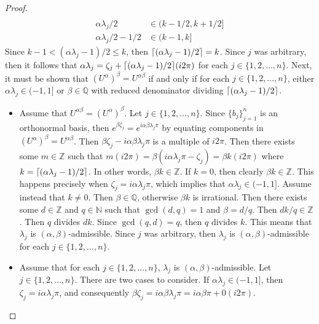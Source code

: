 \begin{proof}
\begin{align*}
        \\
        \alpha\lambda_j / 2
        &\in
        ( k - 1/2, k + 1/2 ]
        \\
        \alpha\lambda_j / 2 - 1/2
        &\in
        ( k - 1, k ]
    \end{align*}
    Since $k - 1 < ( \alpha\lambda_j - 1 ) / 2 \le k$, then $\ceil*{( \alpha \lambda_j - 1 ) / 2} = k$.
    Since $j$ was arbitrary, then it follows that $\alpha\lambda_j = \zeta_j + \ceil*{( \alpha \lambda_j - 1 ) / 2} (i2\pi)$ for each $j \in \{ 1, 2, \ldots, n \}$.
    Next, it must be shown that $( U^\alpha )^\beta = U^{\alpha\beta}$ if and only if for each $j \in \{ 1, 2, \ldots, n \}$, either $\alpha \lambda_j \in ( -1, 1 ]$ or $\beta \in \mathbb{Q}$ with reduced denominator dividing $\ceil*{( \alpha \lambda_j - 1 ) / 2}$.
    \begin{itemize}
    \item Assume that $U^{\alpha\beta} = ( U^\alpha )^\beta$.
          Let $j \in \{ 1, 2, \ldots, n \}$.
          Since $\{ b_j \}_{j=1}^n$ is an orthonormal basis, then $e^{\beta\zeta_j} = e^{i\alpha\beta\lambda_j\pi}$ by equating components in $( U^\alpha )^\beta = U^{\alpha\beta}$.
          Then $\beta\zeta_j - i\alpha\beta\lambda_j\pi$ is a multiple of $i2\pi$.
          Then there exists some $m \in \mathbb{Z}$ such that $m (i2\pi) = \beta(i\alpha\lambda_j\pi - \zeta_j) = \beta k (i2\pi)$ where $k = \ceil*{( \alpha \lambda_j - 1 ) / 2}$.
          In other words, $\beta k \in \mathbb{Z}$.
          If $k = 0$, then clearly $\beta k \in \mathbb{Z}$.
          This happens precisely when $\zeta_j = i\alpha\lambda_j\pi$, which implies that $\alpha\lambda_j \in (-1,1]$.
          Assume instead that $k \ne 0$.
          Then $\beta \in \mathbb{Q}$, otherwise $\beta k$ is irrational.
          Then there exists some $d \in \mathbb{Z}$ and $q \in \mathbb{N}$ such that $\gcd( d, q ) = 1$ and $\beta = d / q$.
          Then $dk / q \in \mathbb{Z}$.
          Then $q$ divides $dk$.
          Since $\gcd( q, d ) = q$, then $q$ divides $k$.
          This means that $\lambda_j$ is $( \alpha, \beta )$-admissible.
          Since $j$ was arbitrary, then $\lambda_j$ is $( \alpha, \beta )$-admissible for each $j \in \{ 1, 2, \ldots, n \}$.
    \item Assume that for each $j \in \{ 1, 2, \ldots, n \}$, $\lambda_j$ is $( \alpha, \beta )$-admissible.
          Let $j \in \{ 1, 2, \ldots, n \}$.
          There are two cases to consider.
          If $\alpha \lambda_j \in (-1,1]$, then $\zeta_j = i\alpha \lambda_j\pi$, and consequently $\beta\zeta_j = i\alpha\beta\lambda_j\pi = i\alpha\beta\pi + 0(i2\pi)$.

\end{itemize}
\end{proof}
